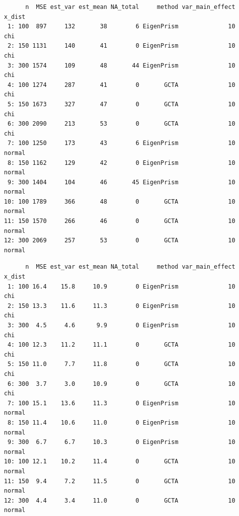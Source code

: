 \documentclass[]{article}
\begin{document}
\begin{verbatim}
      n  MSE est_var est_mean NA_total     method var_main_effect x_dist
 1: 100  897     132       38        6 EigenPrism              10    chi
 2: 150 1131     140       41        0 EigenPrism              10    chi
 3: 300 1574     109       48       44 EigenPrism              10    chi
 4: 100 1274     287       41        0       GCTA              10    chi
 5: 150 1673     327       47        0       GCTA              10    chi
 6: 300 2090     213       53        0       GCTA              10    chi
 7: 100 1250     173       43        6 EigenPrism              10 normal
 8: 150 1162     129       42        0 EigenPrism              10 normal
 9: 300 1404     104       46       45 EigenPrism              10 normal
10: 100 1789     366       48        0       GCTA              10 normal
11: 150 1570     266       46        0       GCTA              10 normal
12: 300 2069     257       53        0       GCTA              10 normal
\end{verbatim}

\begin{verbatim}
      n  MSE est_var est_mean NA_total     method var_main_effect x_dist
 1: 100 16.4    15.8     10.9        0 EigenPrism              10    chi
 2: 150 13.3    11.6     11.3        0 EigenPrism              10    chi
 3: 300  4.5     4.6      9.9        0 EigenPrism              10    chi
 4: 100 12.3    11.2     11.1        0       GCTA              10    chi
 5: 150 11.0     7.7     11.8        0       GCTA              10    chi
 6: 300  3.7     3.0     10.9        0       GCTA              10    chi
 7: 100 15.1    13.6     11.3        0 EigenPrism              10 normal
 8: 150 11.4    10.6     11.0        0 EigenPrism              10 normal
 9: 300  6.7     6.7     10.3        0 EigenPrism              10 normal
10: 100 12.1    10.2     11.4        0       GCTA              10 normal
11: 150  9.4     7.2     11.5        0       GCTA              10 normal
12: 300  4.4     3.4     11.0        0       GCTA              10 normal
\end{verbatim}
\end{document}

